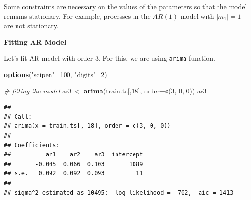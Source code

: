 \documentclass[12pt,openany]{book}
\newenvironment{Shaded}{\begin{snugshade}}{\end{snugshade}}
\newcommand{\CommentTok}[1]{\textcolor[rgb]{0.56,0.35,0.01}{\textit{#1}}}
\newcommand{\DataTypeTok}[1]{\textcolor[rgb]{0.13,0.29,0.53}{#1}}
\newcommand{\DecValTok}[1]{\textcolor[rgb]{0.00,0.00,0.81}{#1}}
\newcommand{\KeywordTok}[1]{\textcolor[rgb]{0.13,0.29,0.53}{\textbf{#1}}}
\newcommand{\NormalTok}[1]{#1}
\newcommand{\StringTok}[1]{\textcolor[rgb]{0.31,0.60,0.02}{#1}}
\begin{document}
Some constraints are necessary on the values of the parameters so that the model remains stationary. For example, processes in the \(AR(1)\) model with \(|m_1| = 1\) are not stationary.

\textbf{Fitting AR Model}

Let's fit AR model with order 3. For this, we are using \texttt{arima} function.

\begin{Shaded}
\begin{Highlighting}[]
\KeywordTok{options}\NormalTok{(}\StringTok{"scipen"}\NormalTok{=}\DecValTok{100}\NormalTok{, }\StringTok{"digits"}\NormalTok{=}\DecValTok{2}\NormalTok{)}

\CommentTok{# fitting the model}
\NormalTok{ar3 <-}\StringTok{ }\KeywordTok{arima}\NormalTok{(train.ts[,}\DecValTok{18}\NormalTok{], }\DataTypeTok{order=}\KeywordTok{c}\NormalTok{(}\DecValTok{3}\NormalTok{, }\DecValTok{0}\NormalTok{, }\DecValTok{0}\NormalTok{))}
\NormalTok{ar3}
\end{Highlighting}
\end{Shaded}

\begin{verbatim}
## 
## Call:
## arima(x = train.ts[, 18], order = c(3, 0, 0))
## 
## Coefficients:
##          ar1    ar2    ar3  intercept
##       -0.005  0.066  0.103       1089
## s.e.   0.092  0.092  0.093         11
## 
## sigma^2 estimated as 10495:  log likelihood = -702,  aic = 1413
\end{verbatim}
\end{document}
